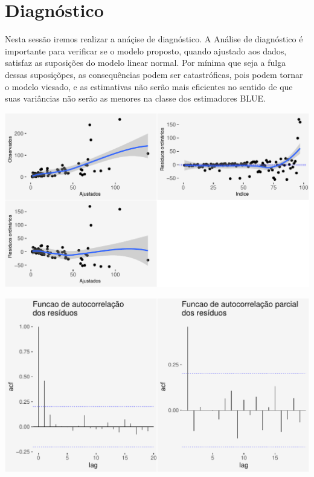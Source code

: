 \documentclass[runningheads]{llncs}\usepackage[]{graphicx}\usepackage[]{color}
\makeatletter
\def\maxwidth{ %
  \ifdim\Gin@nat@width>\linewidth
    \linewidth
  \else
    \Gin@nat@width
  \fi
}
\newenvironment{knitrout}{}{} %
\makeatother
\begin{document}
\section{Diagnóstico }
Nesta sessão iremos realizar a anáçise de diagnóstico. A Análise de diagnóstico é importante para verificar se o modelo proposto, quando ajustado aos dados, satisfaz as suposições do modelo linear normal.
Por mínima que seja a fulga dessas suposiçõpes, as consequências podem ser catastróficas, pois podem tornar o modelo viesado, e as estimativas não serão mais eficientes no sentido de que suas variâncias não serão as menores na classe dos estimadores BLUE.

\begin{knitrout}
\color{fgcolor}
\includegraphics[width=\maxwidth]{figure/unnamed-chunk-18-1} 

\end{knitrout}


\begin{knitrout}
\color{fgcolor}
\includegraphics[width=\maxwidth]{figure/unnamed-chunk-19-1} 

\end{knitrout}
\end{document}
